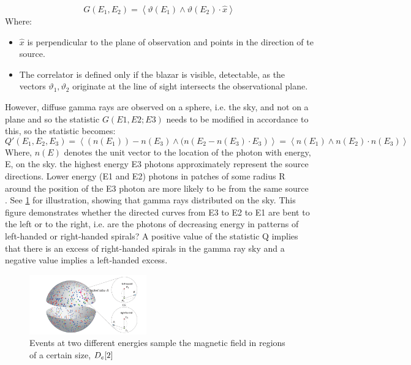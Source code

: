 \begin{equation} 
G(E_{1}, E_{2}) = \left \langle {\vartheta (E_{1}) \wedge \vartheta (E_{2}) \cdot \hat{x}} \right \rangle
\end{equation}
Where: 
\begin{itemize} 
\item $\hat{x}$ is perpendicular to the plane of observation and points in the direction of te source. 
\item The correlator is defined only if the blazar is visible, detectable, as the vectors $\vartheta_{1}, \vartheta_{2}$ originate at the line of sight intersects the observational plane. \cite{4}
\end{itemize}
However, diffuse gamma rays are observed on a sphere, i.e. the sky, and not on a plane and so the statistic $G(E1,E2;E3)$ needs to be modified in accordance to this, so the statistic becomes: 
\begin{equation}
Q'(E_{1}, E_{2}, E_{3}) = \left \langle {({n}(E_{1}))-{n}(E_{3})\wedge({n}(E_{2}-{n}(E_{3})\cdot {E_{3}}) } \right \rangle = \left \langle {{n}(E_{1}) \wedge {n}(E_{2})\cdot {n}(E_{3})} \right \rangle
\end{equation}
Where, $n(E)$ denotes the unit vector to the location of the photon with energy, E, on the sky. the highest energy E3 photons approximately represent the source directions. Lower energy (E1 and E2) photons in patches of some radius R around the position of the E3 photon are more likely to be from the same source \cite{2}.
See \cref{sky} for illustration, showing that gamma rays distributed on the sky. This figure demonstrates whether the directed curves from E3 to E2 to E1 are bent to the left or to the right, i.e. are the photons of decreasing energy in patterns of left-handed or right-handed spirals? A positive value of the statistic Q implies that there is an excess of right-handed spirals in the gamma ray sky and a negative value implies a left-handed excess.\cite{2}
\begin{figure}[hbt!] \label{sky}
\begin{center}
\includegraphics[width=0.451\textwidth]{figs/s.png}
\caption{Events at two different energies sample the magnetic field  in regions of a certain size, $D_{e} \cite{2}$}
\end{center}
\end{figure}

